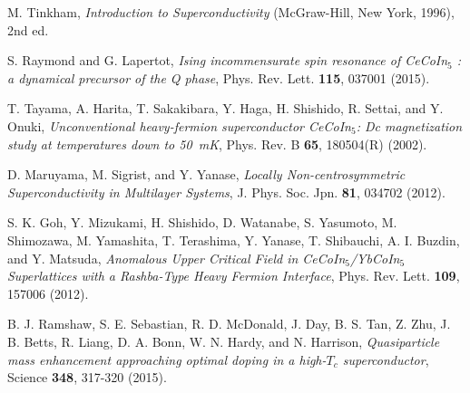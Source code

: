 \documentclass[twocolumn,preprintnumbers,amsmath,amssymb,prl]{revtex4}
\begin{document}
\begin{thebibliography}{99}

		M. Tinkham, 
		{\it Introduction to Superconductivity} (McGraw-Hill, New York, 1996), 2nd ed. 
		
		S. Raymond and G. Lapertot, 
		{\it Ising incommensurate spin resonance of CeCoIn$_5$ : a dynamical precursor of the Q phase}, 
		Phys. Rev. Lett. {\bf 115}, 037001 (2015).
		
		
		T. Tayama, A. Harita, T. Sakakibara, Y. Haga, H. Shishido, R. Settai, and Y. Onuki, 
		{\it Unconventional heavy-fermion superconductor CeCoIn$_5$: Dc magnetization study at temperatures down to 50~mK}, 
		Phys. Rev. B {\bf 65}, 180504(R) (2002). 		
	
		D. Maruyama, M. Sigrist, and Y. Yanase, 
		{\it Locally Non-centrosymmetric Superconductivity in Multilayer Systems}, 
		J. Phys. Soc. Jpn. {\bf 81}, 034702 (2012). 
		
		S. K. Goh, Y. Mizukami, H. Shishido, D. Watanabe, S. Yasumoto, M. Shimozawa, M. Yamashita, T. Terashima, Y. Yanase, T. Shibauchi, A. I. Buzdin, and Y. Matsuda,  
		{\it Anomalous Upper Critical Field in CeCoIn$_5$/YbCoIn$_5$ Superlattices with a Rashba-Type Heavy Fermion Interface}, 
		Phys. Rev. Lett. {\bf 109}, 157006 (2012). 
				
		
		B. J. Ramshaw, S. E. Sebastian, R. D. McDonald, J. Day, B. S. Tan, Z. Zhu, J. B. Betts, R. Liang, D. A. Bonn, W. N. Hardy, and N. Harrison, 
		{\it Quasiparticle mass enhancement approaching optimal doping in a high-$T_c$ superconductor},   
		Science {\bf 348}, 317-320 (2015). 
		

	
\end{thebibliography}
\end{document}
